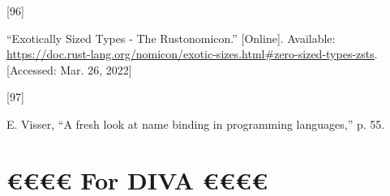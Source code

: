 \documentclass[
  a4paper,
  bibtex,
  english,
  nomenclature]{kthlatex/kththesis/kththesis}
\newlength{\cslhangindent}
\newlength{\csllabelwidth}
\newlength{\cslentryspacingunit} %
\newenvironment{CSLReferences}[2] %
 {%
  \setlength{\parindent}{0pt}
  \ifodd #1
  \let\oldpar\par
  \def\par{\hangindent=\cslhangindent\oldpar}
  \fi
  \setlength{\parskip}{#2\cslentryspacingunit}
 }%
 {}
\newcommand{\CSLLeftMargin}[1]{\parbox[t]{\csllabelwidth}{#1}}
\newcommand{\CSLRightInline}[1]{\parbox[t]{\linewidth - \csllabelwidth}{#1}\break}
\begin{document}
\begin{CSLReferences}{0}{0}
\leavevmode{}%
\CSLLeftMargin{{[}96{]} }
\CSLRightInline{{``Exotically {Sized Types} - {The Rustonomicon}.''}
{[}Online{]}. Available:
\url{https://doc.rust-lang.org/nomicon/exotic-sizes.html\#zero-sized-types-zsts}.
{[}Accessed: Mar. 26, 2022{]}}

\leavevmode{}%
\CSLLeftMargin{{[}97{]} }
\CSLRightInline{E. Visser, {``A fresh look at name binding in
programming languages,''} p. 55. }

\end{CSLReferences}

\label{pg:lastPageofMainmatter}

\cleardoublepage
\clearpage

\thispagestyle{empty}\mbox{} \kthbackcover \fancyhead{}

\section*{€€€€ For DIVA €€€€}

\end{document}
